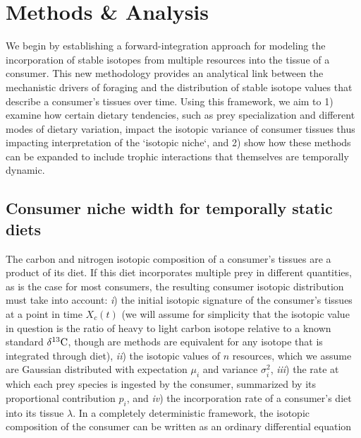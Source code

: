 \documentclass[11pt]{article}
\begin{document}
\section{Methods \& Analysis}
We begin by establishing a forward-integration approach for modeling the incorporation of stable isotopes from multiple resources into the tissue of a consumer.
This new methodology provides an analytical link between the mechanistic drivers of foraging and the distribution of stable isotope values that describe a consumer's tissues over time.
Using this framework, we aim to
1) examine how certain dietary tendencies, such as prey specialization and different modes of dietary variation, impact the isotopic variance of consumer tissues thus impacting interpretation of the `isotopic niche`, and
2) show how these methods can be expanded to include trophic interactions that themselves are temporally dynamic.

\subsection{Consumer niche width for temporally static diets}
The carbon and nitrogen isotopic composition of a consumer's tissues are a product of its diet.
If this diet incorporates multiple prey in different quantities, as is the case for most consumers, the resulting consumer isotopic distribution must take into account:
\emph{i}) the initial isotopic signature of the consumer's tissues at a point in time $X_c(t)$ (we will assume for simplicity that the isotopic value in question is the ratio of heavy to light carbon isotope relative to a known standard $\delta^{13}{\rm C}$, though are methods are equivalent for any isotope that is integrated through diet),
\emph{ii}) the isotopic values of $n$ resources, which we assume are Gaussian distributed with expectation $\mu_i$ and variance $\sigma_i^2$,
\emph{iii}) the rate at which each prey species is ingested by the consumer, summarized by its proportional contribution $p_i$,
and
\emph{iv}) the incorporation rate of a consumer's diet into its tissue $\lambda$.
In a completely deterministic framework, the isotopic composition of the consumer can be written as an ordinary differential equation
\end{document}
